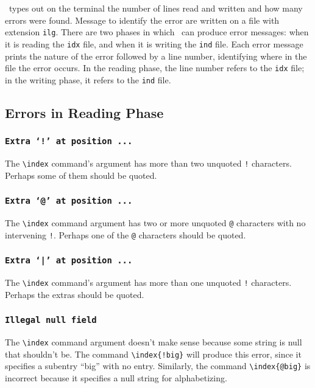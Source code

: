 \MakeIndex\ types out on the terminal the number of lines read and
written and how many errors were found.  Message to identify the error
are written on a file with extension {\tt ilg}.  There are two phases
in which \MakeIndex\ can produce error messages: when it is reading the
{\tt idx} file, and when it is writing the {\tt ind} file.  Each error
message prints the nature of the error followed by a line number,
identifying where in the file the error occurs.  In the reading phase,
the line number refers to the {\tt idx} file; in the writing phase, it
refers to the {\tt ind} file.
 
\subsection{Errors in Reading Phase}
 
\subsubsection*{\tt Extra `!' at position ...}
 
The \verb|\index| command's argument has more than two unquoted
\verb|!| characters.  Perhaps some of them should be quoted.
 
\subsubsection*{\tt Extra `@' at position ...}
 
The \verb|\index| command argument has two or more unquoted \verb|@|
characters with no intervening \verb|!|.  Perhaps one of the \verb|@|
characters should be quoted.
 
\subsubsection*{\tt Extra `|' at position ...}
 
The \verb|\index| command's argument has more than one unquoted \verb|!|
characters.  Perhaps the extras should be quoted.
 
\subsubsection*{\tt Illegal null field}
 
The \verb|\index| command argument doesn't make sense because some
string is null that shouldn't be.  The command \verb|\index{!big}| will
produce this error, since it specifies a subentry ``big'' with no
entry.  Similarly, the command \verb|\index{@big}| is incorrect because
it specifies a null string for alphabetizing.
 
